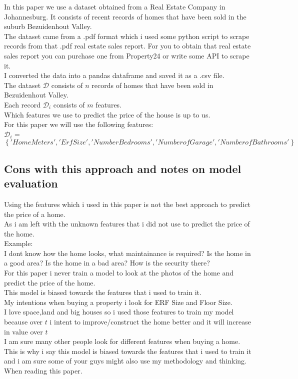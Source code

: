 In this paper we use a dataset obtained from a Real Estate Company in Johannesburg. It consists of recent records of homes that have been sold in the suburb Bezuidenhout Valley. \\

The dataset came from a .pdf format which i used some python script to scrape records from that .pdf real estate sales report. For you to obtain that real estate sales report you can purchase one from Property24 or write some API to scrape it. \\
I converted the data into a pandas dataframe and saved it as a .csv file. \\

The dataset $\mathcal{D}$ consists of $n$ records of homes that have been sold in Bezuidenhout Valley. \\
Each record $\mathcal{D}_i$ consists of $m$ features. \\
Which features we use to predict the price of the house is up to us. \\

For this paper we will use the following features: \\ 
$\mathcal{D}_i$ = $\left\{'Home Meters','Erf Size','Number Bedrooms','Number of Garage','Number of Bathrooms'\right\} $

\subsection{Cons with this approach and notes on model evaluation}
Using the features which i used in this paper is not the best approach to predict the price of a home. \\
As i am left with the unknown features that i did not use to predict the price of the home. \\

Example: \\
I dont know how the home looks, what maintainance is required? Is the home in a good area? Is the home in a bad area? How is the security there?\\

For this paper i never train a model to look at the photos of the home and predict the price of the home. \\
This model is biased towards the features that i used to train it. \\

My intentions when buying a property i look for ERF Size and Floor Size. \\
I love space,land and big houses so i used those features to train my model because over $t$ i intent to improve/construct the home better and it will increase in value over $t$ \\
I am sure many other people look for different features when buying a home. \\
This is why i say this model is biased towards the features that i used to train it and i am sure some of your guys might also use my methodology and thinking. When reading this paper.\\

